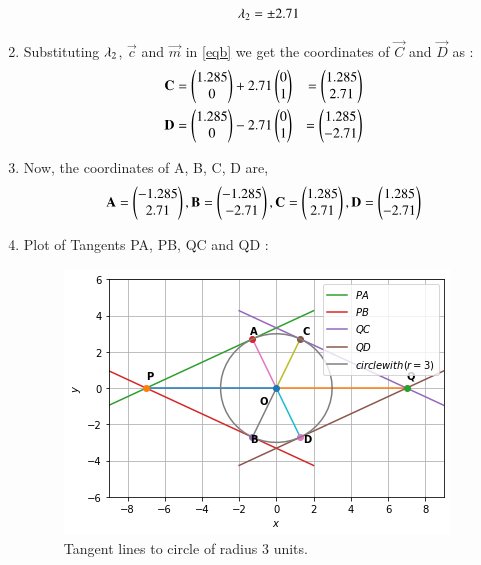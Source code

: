 \documentclass[journal,12pt,twocolumn]{IEEEtran}
\begin{document}
\begin{enumerate}
\begin{itemize}
\begin{align}
\lambda\textsubscript{2} &=\pm 2.71
\end{align}
\end{itemize}
\item Substituting $\lambda\textsubscript{2}$, $\vec{c}$ and $\vec{m}$ in \eqref{eqb} we get the coordinates of $\vec{C}$ and  $\vec{D}$ as :
\begin{align}
\mathbf{C}&=\begin{pmatrix}1.285\\0\end{pmatrix}+ 2.71\begin{pmatrix}0\\1\end{pmatrix}&=\begin{pmatrix}1.285\\2.71\end{pmatrix}
\\
\mathbf{D}&=\begin{pmatrix}1.285\\0\end{pmatrix}- 2.71\begin{pmatrix}0\\1\end{pmatrix}&=\begin{pmatrix}1.285\\-2.71\end{pmatrix}
\end{align}
\item Now, the coordinates of  A, B, C, D are,
\begin{align}
 \mathbf{A}=\begin{pmatrix}-1.285\\2.71\end{pmatrix},\mathbf{B} =\begin{pmatrix}-1.285\\-2.71\end{pmatrix}, \mathbf{C}=\begin{pmatrix}1.285\\2.71\end{pmatrix},\mathbf{D}=\begin{pmatrix}1.285\\-2.71\end{pmatrix}
\end{align}
\item Plot of Tangents PA, PB, QC and QD :
\begin{figure}[ht]
    \centering
    \includegraphics[width=\columnwidth]{FIGURE3.png}
    \caption{Tangent lines to circle of radius 3 units.}
    \label{fig:Tangent lines to circle of radius 3 units.}
\end{figure}
\end{enumerate}    
\end{document}
